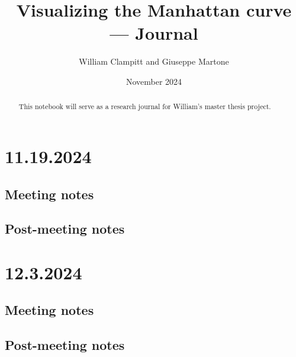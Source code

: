 \documentclass{article}
\title{Visualizing the Manhattan curve --- Journal}
\author{William Clampitt and Giuseppe Martone}
\date{November 2024}
\begin{document}
\maketitle
\begin{abstract}
    This notebook will serve as a research journal for William's master thesis project.
\end{abstract}

\section{11.19.2024}
\subsection{Meeting notes}
\subsection{Post-meeting notes}

\section{12.3.2024}
\subsection{Meeting notes}
\subsection{Post-meeting notes}
\end{document}
